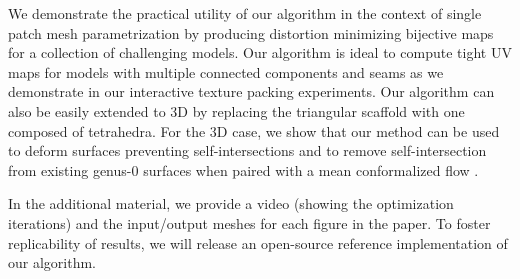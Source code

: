 
We demonstrate the practical utility of our algorithm in the context of single patch mesh parametrization by producing distortion minimizing bijective maps for a collection of  challenging models. Our algorithm is ideal to compute tight UV maps for models with multiple connected components and seams as we demonstrate in our interactive texture packing experiments. Our algorithm can also be easily extended to 3D by replacing the triangular scaffold with one composed of tetrahedra. For the 3D case, we show that our method can be used to deform surfaces preventing self-intersections and to remove self-intersection from existing genus-0 surfaces when paired with a mean conformalized flow \cite{Kazhdan:2012,Sacht:2013}.

In the additional material, we provide a video (showing the optimization iterations) and the input/output meshes for each figure in the paper. To foster replicability of results, we will release an open-source reference implementation of our algorithm. 


